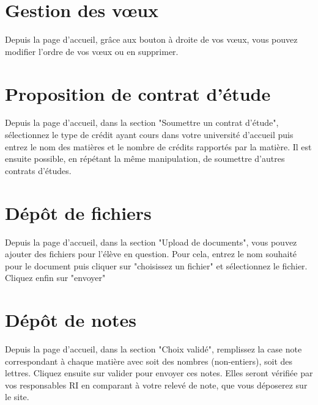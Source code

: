 \section{Gestion des vœux}

Depuis la page d'accueil, grâce aux bouton à droite de vos vœux, vous pouvez modifier l'ordre de vos vœux ou en supprimer.

\section{Proposition de contrat d'étude}
\label{propce}
Depuis la page d'accueil, dans la section "Soumettre un contrat d'étude", sélectionnez le type de crédit ayant cours dans votre université d'accueil puis entrez le nom des matières et le nombre de crédits rapportés par la matière.
Il est ensuite possible, en répétant la même manipulation, de soumettre d'autres contrats d'études.

\section{Dépôt de fichiers}
\label{depfich}
Depuis la page d'accueil, dans la section "Upload de documents", vous pouvez ajouter des fichiers pour l'élève en question. Pour cela, entrez le nom souhaité pour le document puis cliquer sur "choisissez un fichier" et sélectionnez le fichier. Cliquez enfin sur "envoyer" 

\section{Dépôt de notes}
\label{depnot}
Depuis la page d'accueil, dans la section "Choix validé", remplissez la case note correspondant à chaque matière avec soit des nombres (non-entiers), soit des lettres. Cliquez ensuite sur valider pour envoyer ces notes. Elles seront vérifiée par vos responsables RI en comparant à votre relevé de note, que vous déposerez sur le site.